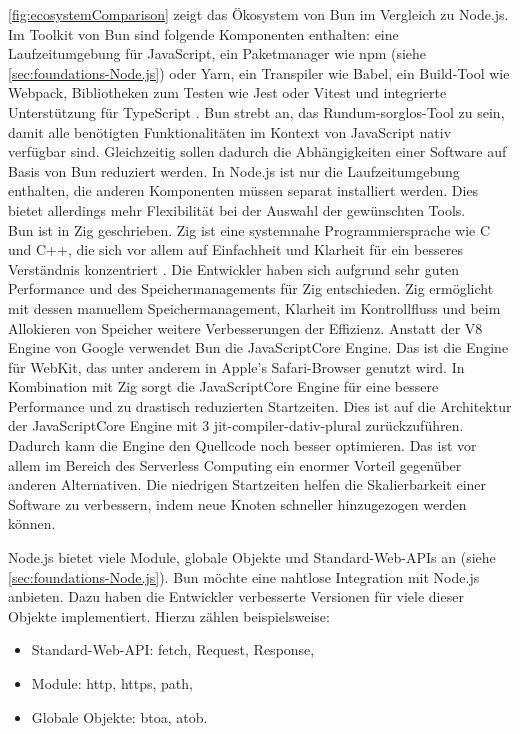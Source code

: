 \noindent
\autoref{fig:ecosystemComparison} zeigt das Ökosystem von Bun im Vergleich zu Node.js. Im Toolkit von Bun sind folgende Komponenten enthalten: eine Laufzeitumgebung für JavaScript, ein Paketmanager wie \ac{npm} (siehe \autoref{sec:foundations-Node.js}) oder Yarn, ein Transpiler wie Babel, ein Build-Tool wie Webpack, Bibliotheken zum Testen wie Jest oder Vitest und integrierte Unterstützung für TypeScript \cite{Sumner.2023c}. Bun strebt an, das Rundum-sorglos-Tool zu sein, damit alle benötigten Funktionalitäten im Kontext von JavaScript nativ verfügbar sind. Gleichzeitig sollen dadurch die Abhängigkeiten einer Software auf Basis von Bun reduziert werden. In Node.js ist nur die Laufzeitumgebung enthalten, die anderen Komponenten müssen separat installiert werden. Dies bietet allerdings mehr Flexibilität bei der Auswahl der gewünschten Tools.\cite{Springer.2022, OvenSh.2023c}\\

\noindent
Bun ist in Zig geschrieben. Zig ist eine systemnahe Programmiersprache wie C und C++, die sich vor allem auf Einfachheit und Klarheit für ein besseres Verständnis konzentriert \cite{ZigSoftwareFoundation.o.J.}. Die Entwickler haben sich aufgrund sehr guten Performance und des Speichermanagements für Zig entschieden. Zig ermöglicht mit dessen manuellem Speichermanagement, Klarheit im Kontrollfluss und beim Allokieren von Speicher weitere Verbesserungen der Effizienz. Anstatt der V8 Engine von Google verwendet Bun die JavaScriptCore Engine. Das ist die Engine für WebKit, das unter anderem in Apple's Safari-Browser genutzt wird. In Kombination mit Zig sorgt die JavaScriptCore Engine für eine bessere Performance und zu drastisch reduzierten Startzeiten. Dies ist auf die Architektur der JavaScriptCore Engine mit 3 \ac{jit-compiler-dativ-plural} zurückzuführen. Dadurch kann die Engine den Quellcode noch besser optimieren. Das ist vor allem im Bereich des Serverless Computing ein enormer Vorteil gegenüber anderen Alternativen. Die niedrigen Startzeiten helfen die Skalierbarkeit einer Software zu verbessern, indem neue Knoten schneller hinzugezogen werden können.\cite{OvenSh.2023c, OvenSh.2022, Apple.o.J., Apple.o.J.b, Silva.2020}

\noindent
Node.js bietet viele Module, globale Objekte und Standard-Web-APIs an (siehe \autoref{sec:foundations-Node.js}). Bun möchte eine nahtlose Integration mit Node.js anbieten. Dazu haben die Entwickler verbesserte Versionen für viele dieser Objekte implementiert. Hierzu zählen beispielsweise:
\begin{itemize}
	\item Standard-Web-API: fetch, Request, Response,
	\item Module: http, https, path,
	\item Globale Objekte: btoa, atob.\cite{OvenSh.2023c} 
\end{itemize} 


